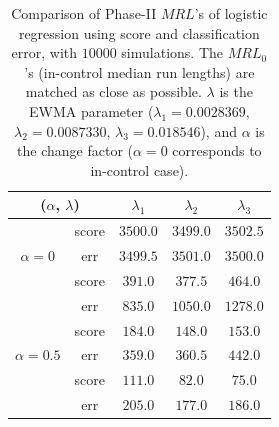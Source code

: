 \documentclass[twoside,11pt]{article}
\begin{document}
\begin{table}[!t]
\centering
\begin{tabular}{ccccc}
\toprule
\multicolumn{2}{c}{($ \alpha$, $ \lambda$)} & {$  \lambda_1$} & {$ \lambda_2$} & {$ \lambda_3$} \\
\midrule
\multirow{3}{*}{$\alpha = 0$} & score &$3500.0$ & $3499.0$ & $3502.5$ \\
& err &$3499.5$ & $3501.0$ & $3500.0$ \\
\midrule
\multirow{3}{*}{$\alpha = 0.3$} & score &$\bm{391.0}$ & $\bm{377.5}$ & $\bm{464.0}$ \\
& err &$835.0$ & $1050.0$ & $1278.0$ \\
\midrule
\multirow{3}{*}{$\alpha = 0.5$} & score &$\bm{184.0}$ & $\bm{148.0}$ & $\bm{153.0}$ \\
& err &$359.0$ & $360.5$ & $442.0$ \\
\midrule
\multirow{3}{*}{$\alpha = 0.7$} & score &$\bm{111.0}$ & $\bm{82.0}$ & $\bm{75.0}$ \\
& err &$205.0$ & $177.0$ & $186.0$ \\
\midrule
\end{tabular}
\caption{Comparison of Phase-II $MRL$'s of logistic regression using score and classification error, with $10000$ simulations. The $MRL_0$'s (in-control median run lengths) are matched as close as possible. $ \lambda$ is the EWMA parameter ({$ \lambda_1 = 0.0028369$}, {$ \lambda_2 = 0.0087330$}, {$ \lambda_3 = 0.018546$}), and $ \alpha$ is the change factor ($ \alpha=0$ corresponds to in-control case).}
\label{tab:logi_MRL}
\end{table}
\end{document}
